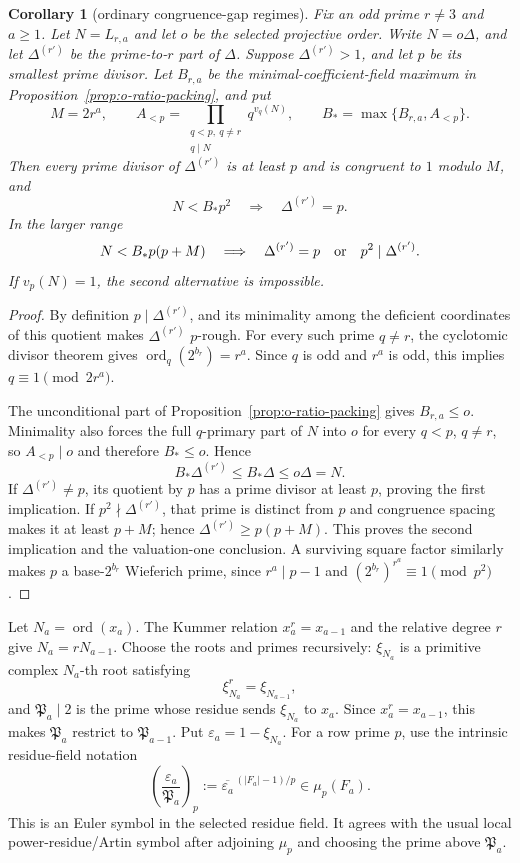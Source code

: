 \documentclass[11pt]{article}
\newtheorem{corollary}[theorem]{Corollary}
\theoremstyle{definition}
\theoremstyle{remark}
\begin{document}
\begin{corollary}[ordinary congruence-gap regimes]
\label{cor:o-one-primary}
Fix an odd prime $r\ne3$ and $a\geq1$.  Let $N=L_{r,a}$ and let $o$ be
the selected projective order.  Write $N=o\Delta$, and let
$\Delta^{(r')}$ be the prime-to-$r$ part of $\Delta$.  Suppose
$\Delta^{(r')}>1$, and let $p$ be its smallest prime divisor.
Let $B_{r,a}$ be the minimal-coefficient-field maximum in
Proposition~\ref{prop:o-ratio-packing}, and put
\[
 M=2r^a,\qquad
 A_{<p}=\prod_{\substack{q<p,\ q\ne r\\q\mid N}}q^{v_q(N)},
 \qquad B_*=\max\{B_{r,a},A_{<p}\}.
\]
Then every prime divisor of $\Delta^{(r')}$ is at least $p$ and is
congruent to $1$ modulo $M$, and
\[
 N<B_*p^2
 \quad\Longrightarrow\quad
 \Delta^{(r')}=p.
\]
In the larger range
\[
 N<B_*p(p+M)
 \quad\Longrightarrow\quad
 \Delta^{(r')}=p\quad\hbox{or}\quad p^2\mid\Delta^{(r')}.
\]
If $v_p(N)=1$, the second alternative is impossible.
\end{corollary}

\begin{proof}
By definition $p\mid\Delta^{(r')}$, and its minimality among the deficient
coordinates of this quotient makes $\Delta^{(r')}$ $p$-rough.  For every such
prime $q\ne r$, the cyclotomic divisor theorem gives
$\operatorname{ord}_q(2^{b_r})=r^a$.  Since $q$ is odd and $r^a$ is odd,
this implies $q\equiv1\pmod {2r^a}$.

The unconditional part of Proposition~\ref{prop:o-ratio-packing} gives
$B_{r,a}\le o$.  Minimality also forces the full $q$-primary part of $N$
into $o$ for every $q<p$, $q\ne r$, so $A_{<p}\mid o$ and therefore
$B_*\le o$.  Hence
\[
 B_*\Delta^{(r')}\le B_*\Delta\le o\Delta=N.
\]
If $\Delta^{(r')}\ne p$, its quotient by $p$ has a prime divisor at least
$p$, proving the first implication.  If $p^2\nmid\Delta^{(r')}$, that prime
is distinct from $p$ and congruence spacing makes it at least $p+M$; hence
$\Delta^{(r')}\ge p(p+M)$.  This proves the second implication and the
valuation-one conclusion.  A surviving square factor similarly makes $p$
a base-$2^{b_r}$ Wieferich prime, since $r^a\mid p-1$ and
$(2^{b_r})^{r^a}\equiv1\pmod {p^2}$.
\end{proof}

Let $N_a=\operatorname{ord}(x_a)$.  The Kummer relation
$x_a^r=x_{a-1}$ and the relative degree $r$ give
$N_a=rN_{a-1}$.  Choose the roots and primes recursively:
$\xi_{N_a}$ is a primitive complex $N_a$-th root satisfying
\[
 \xi_{N_a}^r=\xi_{N_{a-1}},
\]
and $\mathfrak P_a\mid2$ is the prime whose residue sends
$\xi_{N_a}$ to $x_a$.  Since $x_a^r=x_{a-1}$, this makes
$\mathfrak P_a$ restrict to $\mathfrak P_{a-1}$.  Put
$\varepsilon_a=1-\xi_{N_a}$.
For a row prime $p$, use the intrinsic residue-field notation
\[
 \left(\frac{\varepsilon_a}{\mathfrak P_a}\right)_p
 :=\overline{\varepsilon_a}^{\,(|F_a|-1)/p}\in\mu_p(F_a).
\]
This is an Euler symbol in the selected residue field.  It agrees with the
usual local power-residue/Artin symbol after adjoining $\mu_p$ and choosing
the prime above $\mathfrak P_a$.
\end{document}
